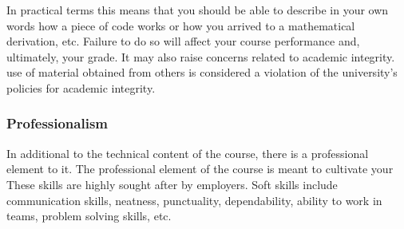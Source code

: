 \documentclass[letterpaper,10pt,english]{sphinxmanual}
\begin{document}
In practical terms this means that you should be able to describe in your own words how a piece of code works or how you arrived to a mathematical derivation, etc. Failure to do so will affect your course performance and, ultimately, your grade. It may also raise concerns related to academic integrity.  use of material obtained from others is considered a violation of the university’s policies for academic integrity.


\subsubsection{Professionalism}
\label{\detokenize{COMP180/organization:professionalism}}
In additional to the technical content of the course, there is a professional element to it. The professional element of the course is meant to cultivate your  These skills are highly sought after by employers. Soft skills include communication skills, neatness, punctuality, dependability, ability to work in teams, problem solving skills, etc.
\end{document}
